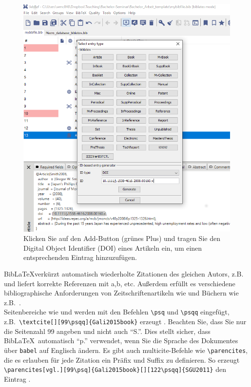 \documentclass[a4paper,12pt]{scrartcl} %
\makeatletter
\def\ScaleIfNeeded{%
\ifdim\Gin@nat@width>\linewidth
\linewidth
\else
\Gin@nat@width
\fi
}
\makeatother
\begin{document}
\begin{figure}[t]
\includegraphics[width=\ScaleIfNeeded]{JabrefDOI}
\caption[Nutzung von DOIs in JabRef]{Klicken Sie auf den Add-Button (grünes Plus) und tragen Sie den Digital Object Identifier (DOI) eines Artikeln ein, um einen entsprechenden Eintrag hinzuzufügen.}\label{fig:jabref_doi}
\end{figure}
Bib\LaTeX verkürzt automatisch wiederholte Zitationen des gleichen Autors, z.B.\ \parencite{SGU2004JET,SGU2004,SGU2009,SGU2011} und liefert korrekte Referenzen mit a,b, etc. Außerdem erfüllt es verschiedene bibliographische Anforderungen von Zeitschriftenartikeln wie \textcite{SGU2004} und Büchern wie z.B.\ \textcite{SGU2005}.\\
Seitenbereiche wie \textcite[][99\psq]{Gali2015book} und \textcite[][99\psqq]{Gali2015book} werden mit den Befehlen \texttt{\textbackslash psq} und \texttt{\textbackslash psqq} eingefügt, z.B.\ \texttt{\textbackslash textcite[][99\textbackslash psqq]\{Gali2015book\}} erzeugt \textcite[][99\psqq]{Gali2015book}. Beachten Sie, dass Sie nur die Seitenzahl 99 angeben und nicht auch ``S.''. Dies stellt sicher, dass Bib\LaTeX\ automatisch ``p.'' verwendet, wenn Sie die Sprache des Dokumentes über \texttt{babel} auf Englisch ändern.
Es gibt auch multicite-Befehle wie \verb|\parencites|, die es erlauben für jede Zitation ein Präfix und Suffix zu definieren. So erzeugt \verb|\parencites[vgl.][99\psq]{Gali2015book}[][122\psqq]{SGU2011}| den Eintrag \parencites[vgl.][99\psq]{Gali2015book}[][122\psqq]{SGU2011}.
\end{document}

